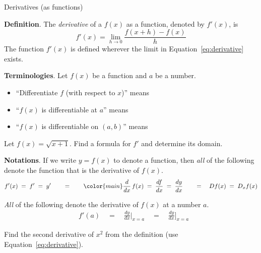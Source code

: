 \documentclass[../main.tex]{subfiles}
\begin{document}
\begin{lesson}{Derivatives (as functions)}

\begin{mdframed}[style=withref]
  \textbf{Definition}. The \emph{derivative} of a \(f(x)\) as a function, denoted by \(f'(x)\), is
  \begin{equation} \label{eq:derivative}
    f'(x) = {\lim_{h \to 0} \frac{f(x+h) - f(x)}{h}}
  \end{equation}
  The function \(f'(x)\) is defined wherever the limit in Equation~\eqref{eq:derivative} exists.

\end{mdframed}
\textbf{Terminologies}. Let \(f(x)\) be a function and \(a\) be a number.
\begin{itemize}
  \item ``Differentiate \(f\) (with respect to \(x\))'' means \underline{\hspace{3in}}
  \item ``\(f(x)\) is differentiable at \(a\)'' means \underline{\hspace{3.62in}}
  \item ``\(f(x)\) is differentiable on \((a,b)\)'' means \underline{\hspace{3.36in}}
\end{itemize}

\bigskip
\begin{example}
  Let \(f(x) = \sqrt{x + 1}\). Find a formula for \(f'\) and determine its domain.

\end{example}

\clearpage

\textbf{Notations}. If we write \(y = f(x)\) to denote a function, then \emph{all} of the following denote the function that is the derivative of \(f(x)\).
\[
  f'(x) 
  \;=\; f' 
  \;=\; y' 
  \qquad =\qquad  
  {\color{main} \frac{d}{dx}} \, f(x) \;=\; \frac{df}{dx} \;=\; \frac{dy}{dx}
  \qquad=\quad 
  Df(x) 
  \;=\; D_{x} f(x)
\]

\emph{All} of the following denote the derivative of \(f(x)\) at a number \(a\).
\begin{align*}
  & f'(a) \quad=\quad \frac{dy}{dx} \bigg|_{x = a} \quad=\quad \frac{dy}{dx} \bigg]_{x = a}
\end{align*}


\begin{example}
  Find the second derivative of \(x^{2}\) from the definition (use Equation~\eqref{eq:derivative}).


\end{example}
\end{lesson}
\end{document}
